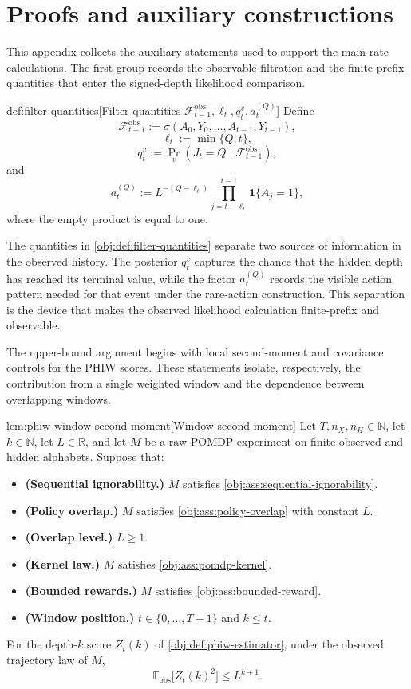 \documentclass[11pt]{article}
\begin{document}
\section{Proofs and auxiliary constructions}

This appendix collects the auxiliary statements used to support the main rate calculations. The first group records the observable filtration and the finite-prefix quantities that enter the signed-depth likelihood comparison.

\begin{definitionv}{def:filter-quantities}[Filter quantities \(\mathcal F_{t-1}^{\mathrm{obs}},\ell_t,q_t^v,a_t^{(Q)}\)]
Define
\[
\mathcal F_{t-1}^{\mathrm{obs}}
:=
\sigma(A_0,Y_0,\ldots,A_{t-1},Y_{t-1}),
\]
\[
\ell_t:=\min\{Q,t\},
\]
\[
q_t^v
:=
\Pr_v(J_t=Q\mid\mathcal F_{t-1}^{\mathrm{obs}}),
\]
and
\[
a_t^{(Q)}
:=
L^{-(Q-\ell_t)}
\prod_{j=t-\ell_t}^{t-1}\mathbf 1\{A_j=1\},
\]
where the empty product is equal to one.
\end{definitionv}

The quantities in \cref{obj:def:filter-quantities} separate two sources of information in the observed history. The posterior \(q_t^v\) captures the chance that the hidden depth has reached its terminal value, while the factor \(a_t^{(Q)}\) records the visible action pattern needed for that event under the rare-action construction. This separation is the device that makes the observed likelihood calculation finite-prefix and observable.

The upper-bound argument begins with local second-moment and covariance controls for the PHIW scores. These statements isolate, respectively, the contribution from a single weighted window and the dependence between overlapping windows.

\begin{lemmav}{lem:phiw-window-second-moment}[Window second moment]
Let \(T,n_X,n_H\in\mathbb N\), let \(k\in\mathbb N\), let \(L\in\mathbb R\), and let \(M\) be a raw POMDP experiment on finite observed and hidden alphabets. Suppose that:
\begin{itemize}
\item \textbf{(Sequential ignorability.)} \(M\) satisfies \cref{obj:ass:sequential-ignorability}.
\item \textbf{(Policy overlap.)} \(M\) satisfies \cref{obj:ass:policy-overlap} with constant \(L\).
\item \textbf{(Overlap level.)} \(L\ge 1\).
\item \textbf{(Kernel law.)} \(M\) satisfies \cref{obj:ass:pomdp-kernel}.
\item \textbf{(Bounded rewards.)} \(M\) satisfies \cref{obj:ass:bounded-reward}.
\item \textbf{(Window position.)} \(t\in\{0,\ldots,T-1\}\) and \(k\le t\).
\end{itemize}
For the depth-\(k\) score \(Z_t(k)\) of \cref{obj:def:phiw-estimator}, under the observed trajectory law of \(M\),
\[
\mathbb E_{\mathrm{obs}}\bigl[Z_t(k)^2\bigr]\le L^{k+1}.
\]
\end{lemmav}
\end{document}
